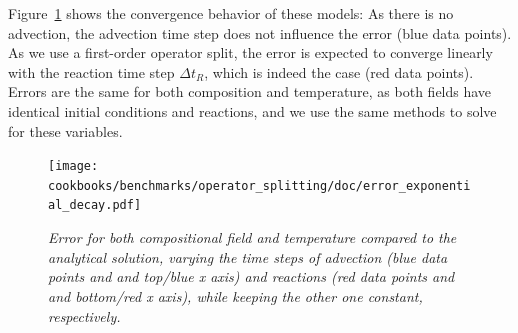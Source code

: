 \documentclass{article}
\begin{document}
Figure~\ref{fig:exponential-decay} shows the convergence behavior of these models: As there is no advection, the advection time step does not influence the error (blue data points). As we use a first-order operator split, the error is expected to converge linearly with the reaction time step $\Delta t_R$, which is indeed the case (red data points).
Errors are the same for both composition and temperature, as both fields have identical initial conditions and reactions, and we use the same methods to solve for these variables.
\begin{figure}
  \begin{center}
    \texttt{[image: cookbooks/benchmarks/operator\_splitting/doc/error\_exponential\_decay.pdf]}
  \end{center}
  \caption{\it Error for both compositional field and temperature compared to the analytical solution, varying the time steps of advection (blue data points and and top/blue x axis) and reactions (red data points and and bottom/red x axis), while keeping the other one constant, respectively.}
  \label{fig:exponential-decay}
\end{figure}
\end{document}
